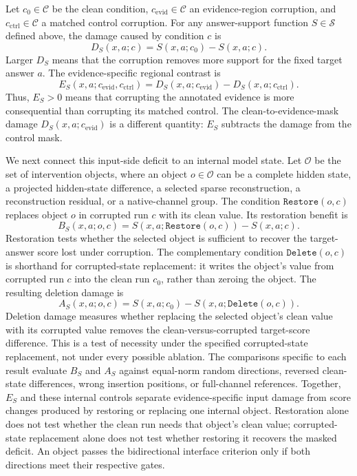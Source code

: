 Let $c_0\in\mathcal{C}$ be the clean condition, $c_{\mathrm{evid}}\in\mathcal{C}$ an evidence-region corruption, and $c_{\mathrm{ctrl}}\in\mathcal{C}$ a matched control corruption. For any answer-support function $S\in\mathcal{S}$ defined above, the damage caused by condition $c$ is
\begin{equation}
    D_S(x,a;c)=S(x,a;c_0)-S(x,a;c).
    \label{eq:app-corruption-damage}
\end{equation}
Larger $D_S$ means that the corruption removes more support for the fixed target answer $a$. The evidence-specific regional contrast is
\begin{equation}
    E_S(x,a;c_{\mathrm{evid}},c_{\mathrm{ctrl}})
    =D_S(x,a;c_{\mathrm{evid}})-D_S(x,a;c_{\mathrm{ctrl}}).
    \label{eq:app-evidence-control-contrast}
\end{equation}
Thus, $E_S>0$ means that corrupting the annotated evidence is more consequential than corrupting its matched control. The clean-to-evidence-mask damage $D_S(x,a;c_{\mathrm{evid}})$ is a different quantity: $E_S$ subtracts the damage from the control mask.

We next connect this input-side deficit to an internal model state. Let $\mathcal{O}$ be the set of intervention objects, where an object $o\in\mathcal{O}$ can be a complete hidden state, a projected hidden-state difference, a selected sparse reconstruction, a reconstruction residual, or a native-channel group. The condition $\mathtt{Restore}(o,c)$ replaces object $o$ in corrupted run $c$ with its clean value. Its restoration benefit is
\begin{equation}
    B_S(x,a;o,c)
    =S\!\left(x,a;\mathtt{Restore}(o,c)\right)-S(x,a;c).
    \label{eq:app-restoration-benefit}
\end{equation}
Restoration tests whether the selected object is sufficient to recover the target-answer score lost under corruption. The complementary condition $\mathtt{Delete}(o,c)$ is shorthand for corrupted-state replacement: it writes the object's value from corrupted run $c$ into the clean run $c_0$, rather than zeroing the object. The resulting deletion damage is
\begin{equation}
    A_S(x,a;o,c)
    =S(x,a;c_0)-S\!\left(x,a;\mathtt{Delete}(o,c)\right).
    \label{eq:app-deletion-damage}
\end{equation}
Deletion damage measures whether replacing the selected object's clean value with its corrupted value removes the clean-versus-corrupted target-score difference. This is a test of necessity under the specified corrupted-state replacement, not under every possible ablation. The comparisons specific to each result evaluate $B_S$ and $A_S$ against equal-norm random directions, reversed clean-state differences, wrong insertion positions, or full-channel references. Together, $E_S$ and these internal controls separate evidence-specific input damage from score changes produced by restoring or replacing one internal object. Restoration alone does not test whether the clean run needs that object's clean value; corrupted-state replacement alone does not test whether restoring it recovers the masked deficit. An object passes the bidirectional interface criterion only if both directions meet their respective gates.


